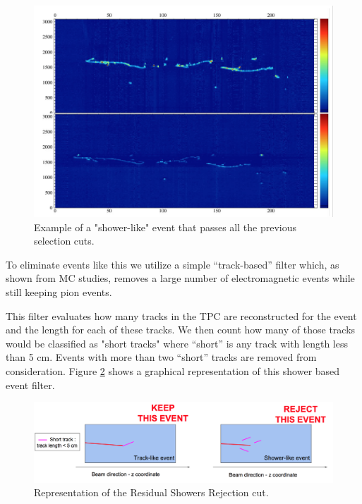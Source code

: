 \begin{itemize}
\begin{figure}[h!]
\centering
\includegraphics[scale=0.45]{./images/showerEvent.png}
\caption{Example of a "shower-like" event that passes all the previous selection cuts.}
\label{fig:stillShow}
\end{figure}

To eliminate events like this we utilize a simple ``track-based'' filter which, as shown from MC studies, removes a large number of electromagnetic events while still keeping pion events. 

This filter evaluates how many tracks in the TPC are reconstructed for the event and the length for each of these tracks. We then count how many of those tracks would be classified as "short tracks" where ``short'' is any track with length less than 5 cm. Events with more than two ``short'' tracks are removed from consideration. Figure \ref{fig:showrej} shows a graphical representation of this shower based event filter.

\begin{figure}[h!]
\centering
\includegraphics[scale=0.45]{./images/ShowerRejection.png}
\caption{Representation of the Residual Showers Rejection cut.}
\label{fig:showrej}
\end{figure}


\end{itemize}
